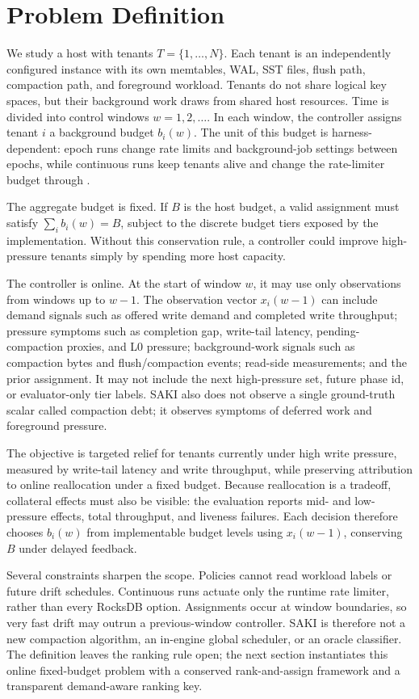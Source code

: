 \section{Problem Definition}

We study a host with tenants \(T=\{1,\ldots,N\}\). Each tenant is an
independently configured \rocksdb instance with its own memtables, WAL, SST
files, flush path, compaction path, and foreground workload. Tenants do not
share logical key spaces, but their background work draws from shared host
resources. Time is divided into control windows \(w=1,2,\ldots\). In each
window, the controller assigns tenant \(i\) a background budget \(b_i(w)\). The
unit of this budget is harness-dependent: epoch runs change rate limits and
background-job settings between epochs, while continuous runs keep tenants alive
and change the rate-limiter budget through \ratecall.

The aggregate budget is fixed. If \(B\) is the host budget, a valid assignment
must satisfy \(\sum_i b_i(w)=B\), subject to the discrete budget tiers exposed by
the implementation. Without this conservation rule, a controller could improve
high-pressure tenants simply by spending more host capacity.

The controller is online. At the start of window \(w\), it may use only
observations from windows up to \(w-1\). The observation vector \(x_i(w-1)\)
can include demand signals such as offered write demand and completed write
throughput; pressure symptoms such as completion gap, write-tail latency,
pending-compaction proxies, and L0 pressure; background-work signals such as
compaction bytes and flush/compaction events; read-side measurements; and the
prior assignment. It may not include the next high-pressure set, future phase
id, or evaluator-only tier labels. SAKI also does not observe a single
ground-truth scalar called compaction debt; it observes symptoms of deferred
work and foreground pressure.

The objective is targeted relief for tenants currently under high write
pressure, measured by write-tail latency and write throughput, while preserving
attribution to online reallocation under a fixed budget. Because reallocation is
a tradeoff, collateral effects must also be visible: the evaluation reports
mid- and low-pressure effects, total throughput, and liveness failures. Each
decision therefore chooses \(b_i(w)\) from implementable budget levels using
\(x_i(w-1)\), conserving \(B\) under delayed feedback.

Several constraints sharpen the scope. Policies cannot read workload labels or
future drift schedules. Continuous runs actuate only the runtime rate limiter,
rather than every RocksDB option. Assignments occur at window boundaries, so
very fast drift may outrun a previous-window controller. SAKI is therefore not a
new compaction algorithm, an in-engine global scheduler, or an oracle
classifier. The definition leaves the ranking rule open; the next section
instantiates this online fixed-budget problem with a conserved rank-and-assign
framework and a transparent demand-aware ranking key.
